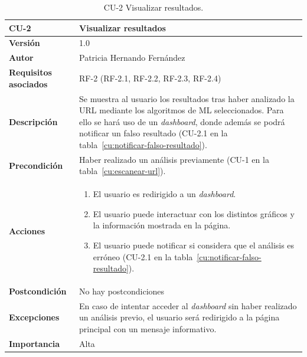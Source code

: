 \begin{table}[p]
	\centering
	\begin{tabularx}{\linewidth}{ p{} p{} }
		\toprule
		\textbf{CU-2}    & \textbf{Visualizar resultados}\\
		\toprule
		\textbf{Versión}              & 1.0    \\
		\textbf{Autor}                & Patricia Hernando Fernández \\
		\textbf{Requisitos asociados} & RF-2 (RF-2.1, RF-2.2, RF-2.3, RF-2.4) \\
		\textbf{Descripción}          & Se muestra al usuario los resultados tras haber analizado la URL mediante los algoritmos de ML seleccionados. Para ello se hará uso de un \textit{dashboard}, donde además se podrá notificar un falso resultado (CU-2.1 en la tabla~\ref{cu:notificar-falso-resultado}).\\
		\textbf{Precondición}         & Haber realizado un análisis previamente (CU-1 en la tabla~\ref{cu:escanear-url}). \\
		\textbf{Acciones}             &
		\begin{enumerate}
			\def\labelenumi{\arabic{enumi}.}
			\tightlist
			\item El usuario es redirigido a un \textit{dashboard}.
			\item El usuario puede interactuar con los distintos gráficos y la información mostrada en la página.
			\item El usuario puede notificar si considera que el análisis es erróneo (CU-2.1 en la tabla~\ref{cu:notificar-falso-resultado}).
		\end{enumerate}\\
		\textbf{Postcondición}        & No hay postcondiciones \\
		\textbf{Excepciones}          & En caso de intentar acceder al \textit{dashboard} sin haber realizado un análisis previo, el usuario será redirigido a la página principal con un mensaje informativo.\\
		\textbf{Importancia}          & Alta \\
		\bottomrule
	\end{tabularx}
	\caption{CU-2 Visualizar resultados.}
	\label{cu:visualizar-resultados}
\end{table}


